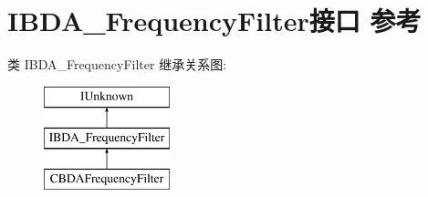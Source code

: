 \hypertarget{interface_i_b_d_a___frequency_filter}{}\section{I\+B\+D\+A\+\_\+\+Frequency\+Filter接口 参考}
\label{interface_i_b_d_a___frequency_filter}
类 I\+B\+D\+A\+\_\+\+Frequency\+Filter 继承关系图\+:\begin{figure}[H]
\begin{center}
\leavevmode
\includegraphics[height=3.000000cm]{interface_i_b_d_a___frequency_filter}
\end{center}
\end{figure}
